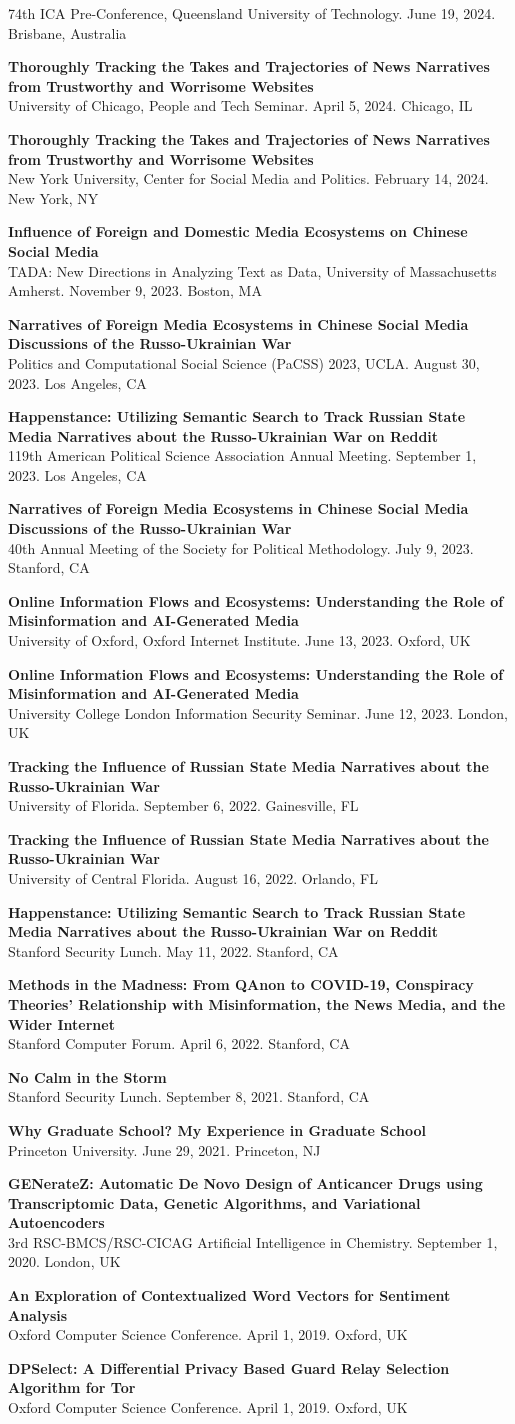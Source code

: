 \documentclass[11pt,letterpaper]{article}
\newcommand{\talk}[2]{%
  \Needspace{3\baselineskip}%
  \item \textbf{#1}\\{\small\color{inksoft}#2}
}
\begin{document}
\begin{plain}
     {74th ICA Pre-Conference, Queensland University of Technology. June 19, 2024. Brisbane, Australia}
\talk{Thoroughly Tracking the Takes and Trajectories of News Narratives from Trustworthy and Worrisome Websites}
     {University of Chicago, People and Tech Seminar. April 5, 2024. Chicago, IL}
\talk{Thoroughly Tracking the Takes and Trajectories of News Narratives from Trustworthy and Worrisome Websites}
     {New York University, Center for Social Media and Politics. February 14, 2024. New York, NY}
\talk{Influence of Foreign and Domestic Media Ecosystems on Chinese Social Media}
     {TADA: New Directions in Analyzing Text as Data, University of Massachusetts Amherst. November 9, 2023. Boston, MA}
\talk{Narratives of Foreign Media Ecosystems in Chinese Social Media Discussions of the Russo-Ukrainian War}
     {Politics and Computational Social Science (PaCSS) 2023, UCLA. August 30, 2023. Los Angeles, CA}
\talk{Happenstance: Utilizing Semantic Search to Track Russian State Media Narratives about the Russo-Ukrainian War on Reddit}
     {119th American Political Science Association Annual Meeting. September 1, 2023. Los Angeles, CA}
\talk{Narratives of Foreign Media Ecosystems in Chinese Social Media Discussions of the Russo-Ukrainian War}
     {40th Annual Meeting of the Society for Political Methodology. July 9, 2023. Stanford, CA}
\talk{Online Information Flows and Ecosystems: Understanding the Role of Misinformation and AI-Generated Media}
     {University of Oxford, Oxford Internet Institute. June 13, 2023. Oxford, UK}
\talk{Online Information Flows and Ecosystems: Understanding the Role of Misinformation and AI-Generated Media}
     {University College London Information Security Seminar. June 12, 2023. London, UK}
\talk{Tracking the Influence of Russian State Media Narratives about the Russo-Ukrainian War}
     {University of Florida. September 6, 2022. Gainesville, FL}
\talk{Tracking the Influence of Russian State Media Narratives about the Russo-Ukrainian War}
     {University of Central Florida. August 16, 2022. Orlando, FL}
\talk{Happenstance: Utilizing Semantic Search to Track Russian State Media Narratives about the Russo-Ukrainian War on Reddit}
     {Stanford Security Lunch. May 11, 2022. Stanford, CA}
\talk{Methods in the Madness: From QAnon to COVID-19, Conspiracy Theories' Relationship with Misinformation, the News Media, and the Wider Internet}
     {Stanford Computer Forum. April 6, 2022. Stanford, CA}
\talk{No Calm in the Storm}
     {Stanford Security Lunch. September 8, 2021. Stanford, CA}
\talk{Why Graduate School? My Experience in Graduate School}
     {Princeton University. June 29, 2021. Princeton, NJ}
\talk{GENerateZ: Automatic De Novo Design of Anticancer Drugs using Transcriptomic Data, Genetic Algorithms, and Variational Autoencoders}
     {3rd RSC-BMCS/RSC-CICAG Artificial Intelligence in Chemistry. September 1, 2020. London, UK}
\talk{An Exploration of Contextualized Word Vectors for Sentiment Analysis}
     {Oxford Computer Science Conference. April 1, 2019. Oxford, UK}
\talk{DPSelect: A Differential Privacy Based Guard Relay Selection Algorithm for Tor}
     {Oxford Computer Science Conference. April 1, 2019. Oxford, UK}
\end{plain}
\end{document}

